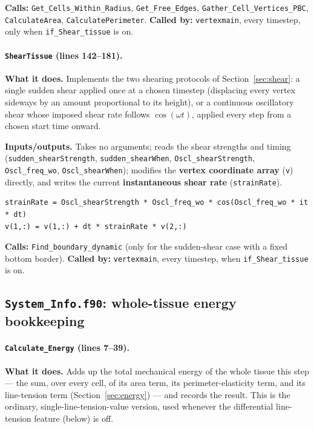 \documentclass[11pt]{article}
\begin{document}
\textbf{Calls:} \texttt{Get\_Cells\_Within\_Radius}, \texttt{Get\_Free\_Edges},
\texttt{Gather\_Cell\_Vertices\_PBC}, \texttt{CalculateArea},
\texttt{CalculatePerimeter}. \textbf{Called by:} \texttt{vertexmain}, every timestep,
only when \texttt{if\_Shear\_tissue} is on.

\paragraph{\texttt{ShearTissue} (lines 142--181).}
\textbf{What it does.} Implements the two shearing protocols of Section~\ref{sec:shear}:
a single sudden shear applied once at a chosen timestep (displacing every vertex
sideways by an amount proportional to its height), or a continuous oscillatory shear
whose imposed shear rate follows $\cos(\omega t)$, applied every step from a chosen
start time onward.

\textbf{Inputs/outputs.} Takes no arguments; reads the shear strengths and timing
(\texttt{sudden\_shearStrength}, \texttt{sudden\_shearWhen}, \texttt{Oscl\_shearStrength},
\texttt{Oscl\_freq\_wo}, \texttt{Oscl\_shearWhen}); modifies the \textbf{vertex coordinate
array} (\texttt{v}) directly, and writes the current \textbf{instantaneous shear rate}
(\texttt{strainRate}).

\begin{lstlisting}[caption={The oscillatory-shear displacement in \texttt{ShearTissue}.}]
strainRate = Oscl_shearStrength * Oscl_freq_wo * cos(Oscl_freq_wo * it * dt)
v(1,:) = v(1,:) + dt * strainRate * v(2,:)
\end{lstlisting}

\textbf{Calls:} \texttt{Find\_boundary\_dynamic} (only for the sudden-shear case with a
fixed bottom border). \textbf{Called by:} \texttt{vertexmain}, every timestep, when
\texttt{if\_Shear\_tissue} is on.

\subsection{\texttt{System\_Info.f90}: whole-tissue energy bookkeeping}
\label{sec:codesysinfo}

\paragraph{\texttt{Calculate\_Energy} (lines 7--39).}
\textbf{What it does.} Adds up the total mechanical energy of the whole tissue this
step --- the sum, over every cell, of its area term, its perimeter-elasticity term, and
its line-tension term (Section~\ref{sec:energy}) --- and records the result. This is
the ordinary, single-line-tension-value version, used whenever the differential
line-tension feature (below) is off.
\end{document}
